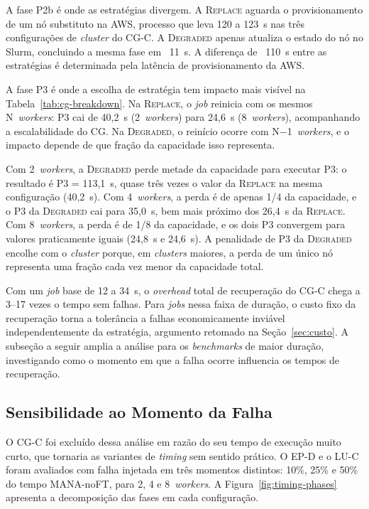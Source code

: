 A fase P2b é onde as estratégias divergem. A \textsc{Replace} aguarda o
provisionamento de um nó substituto na AWS, processo que leva 120 a 123~s nas três
configurações de \textit{cluster} do CG-C. A \textsc{Degraded} apenas
atualiza o estado do nó no Slurm, concluindo a mesma fase em ~11~s. A diferença de
~110~s entre as estratégias é determinada pela latência de provisionamento da AWS.

A fase P3 é onde a escolha de estratégia tem impacto mais visível na
Tabela~\ref{tab:cg-breakdown}. Na \textsc{Replace}, o \textit{job} reinicia com os
mesmos N~\textit{workers}: P3 cai de 40,2~s (2~\textit{workers}) para 24,6~s
(8~\textit{workers}), acompanhando a escalabilidade do CG. Na \textsc{Degraded}, o
reinício ocorre com N$-$1~\textit{workers}, e o impacto depende de que fração da
capacidade isso representa.

Com 2~\textit{workers}, a \textsc{Degraded} perde metade da capacidade para executar
P3: o resultado é P3 = 113,1~s, quase três vezes o valor da \textsc{Replace} na mesma
configuração (40,2~s). Com 4~\textit{workers}, a perda é de apenas 1/4 da capacidade,
e o P3 da \textsc{Degraded} cai para 35,0~s, bem mais próximo dos 26,4~s da
\textsc{Replace}. Com 8~\textit{workers}, a perda é de 1/8 da capacidade, e os dois
P3 convergem para valores praticamente iguais (24,8~s e 24,6~s). A penalidade de P3
da \textsc{Degraded} encolhe com o \textit{cluster} porque, em \textit{clusters}
maiores, a perda de um único nó representa uma fração cada vez menor da capacidade
total.

Com um \textit{job} base de 12 a 34~s, o \textit{overhead} total de recuperação do
CG-C chega a 3--17 vezes o tempo sem falhas. Para \textit{jobs} nessa faixa de
duração, o custo fixo da recuperação torna a tolerância a falhas economicamente
inviável independentemente da estratégia, argumento retomado na Seção~\ref{sec:custo}.
A subseção a seguir amplia a análise para os \textit{benchmarks} de maior duração,
investigando como o momento em que a falha ocorre influencia os tempos de recuperação.

\subsection{Sensibilidade ao Momento da Falha}
\label{sec:timing-sensitivity}

O CG-C foi excluído dessa análise em razão do seu tempo de execução muito curto, que
tornaria as variantes de \textit{timing} sem sentido prático. O EP-D e o LU-C foram
avaliados com falha injetada em três momentos distintos: 10\%, 25\% e 50\% do tempo
MANA-noFT, para 2, 4 e 8~\textit{workers}.
A Figura~\ref{fig:timing-phases} apresenta a decomposição das fases em cada
configuração.

